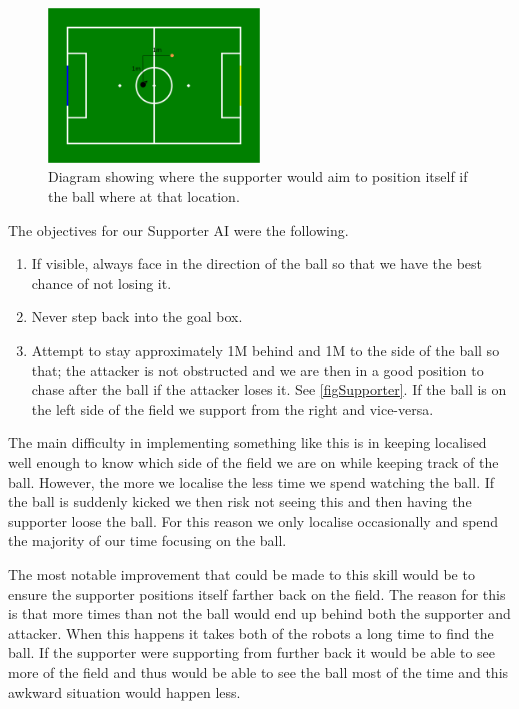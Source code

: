 \documentclass[pdftex,11pt,a4paper]{report}
\begin{document}
\begin{figure}[ht]
\centering
\includegraphics[width=0.5\textwidth]{figures/supporter}
\caption{Diagram showing where the supporter would aim to position itself if the ball where at that location.} \label{figSupporter}
\end{figure} 


The objectives for our Supporter AI were the following.
\begin{enumerate}
\item If visible, always face in the direction of the ball so that we have the best chance of not losing it.
\item Never step back into the goal box.
\item Attempt to stay approximately 1M behind and 1M to the side of the ball so that; the attacker is not obstructed and we are then in a good position to chase after the ball if the attacker loses it. See \autoref{figSupporter}. If the ball is on the left side of the field we support from the right and vice-versa.
\end{enumerate}

The main difficulty in implementing something like this is in keeping localised well enough to know which side of the field we are on while keeping track of the ball. However, the more we localise the less time we spend watching the ball. If the ball is suddenly kicked we then risk not seeing this and then having the supporter loose the ball. For this reason we only localise occasionally and spend the majority of our time focusing on the ball.

The most notable improvement that could be made to this skill would be to ensure the supporter positions itself farther back on the field. The reason for this is that more times than not the ball would end up behind both the supporter and attacker. When this happens it takes both of the robots a long time to find the ball. If the supporter were supporting from further back it would be able to see more of the field and thus would be able to see the ball most of the time and this awkward situation would happen less. 
\end{document}
